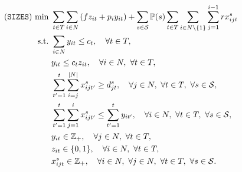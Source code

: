 
\begin{subequations} \label{sizes:formulation}
	\begin{align}
	(\texttt{SIZES})\ \textrm{min}\ &\sum_{t\in T}\sum_{i\in N} \left(fz_{it} + p_i y_{it} \right) + 
	\sum_{s\in \mathcal{S}} \PP(s)\sum_{t\in T}\sum_{i\in N\backslash\{1\}}\sum_{j=1}^{i-1}rx_{ijt}^s \label{sizes:obj}\\
	\textrm{s.t.}\ &\sum_{i\in N}y_{it}\le c_{t},\quad \forall t\in T, \label{sizes:b}\\
	&y_{it}\le c_{t} z_{it},\quad\forall i \in N,\ \forall t\in T,\label{sizes:c}\\
	&\sum_{t'=1}^{t}\sum_{i=j}^{|N|} x_{ijt'}^s \ge d_{jt}^s,\quad\forall j\in N,\ \forall t\in T,\  \forall s\in \mathcal{S},\label{sizes:d}\\
	&\sum_{t'=1}^{t}\sum_{j=1}^{i}x_{ijt'}^s\le\sum_{t'=1}^{t}y_{it'}, \quad\forall i\in N,\ \forall t\in T,\ \forall s\in \mathcal{S},\label{sizes:e}\\
	&y_{it}\in\mathbb{Z}_+,\quad \forall j\in N,\ \forall t\in T,\label{sizes:f}\\
	&z_{it}\in\{0,1\},\quad\forall i\in N,\ \forall t\in T,\label{sizes:g}\\
	&x_{ijt}^s\in\mathbb{Z}_+,\quad\forall i\in N,\ \forall j\in N,\ \forall t\in T,\ \forall s\in \mathcal{S}.\label{sizes:h}
	\end{align}
\end{subequations}

